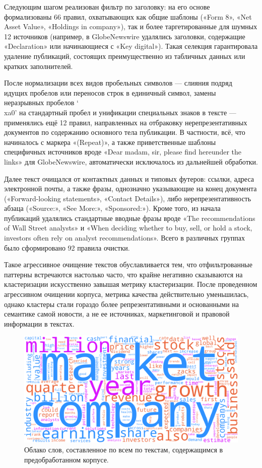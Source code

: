 Следующим шагом реализован фильтр по заголовку: на его основе формализованы 66 правил, охватывающих как общие
шаблоны («Form 8», «Net Asset Value», «Holdings in company»), так и более таргетированные для шумных 12 источников
(например, в GlobeNewswire удалялись заголовки, содержащие «Declaration» или начинающиеся с «Key digital»). Такая
селекция гарантировала удаление публикаций, состоящих преимущественно из табличных данных или кратких заполнителей.

После нормализации всех видов пробельных символов — слияния подряд идущих пробелов или переносов строк в единичный
символ, замены неразрывных пробелов ‘\\xa0’ на стандартный пробел и унификации специальных знаков в тексте ---
применялись ещё 12 правил, направленных на отбраковку нерепрезентативных документов по содержанию основного тела
публикации. В частности, всё, что начиналось с маркера «(Repeat)», а также приветственные шаблоны специфичных
источников вроде «Dear madam, sir, please find hereunder the links» для GlobeNewswire, автоматически исключалось
из дальнейшей обработки.

Далее текст очищался от контактных данных и типовых футеров: ссылки, адреса электронной почты, а также фразы,
однозначно указывающие на конец документа («Forward-looking statements», «Contact Details»), либо нерепрезентативность
абзаца («Source:», «See More:», «Sponsored:»). Кроме того, из начала публикаций удалялись стандартные вводные фразы вроде
«The recommendations of Wall Street analysts» и «When deciding whether to buy, sell, or hold a stock, investors often
rely on analyst recommendations». Всего в различных группах было сформировано 92 правила очистки.

Такое агрессивное очищение текстов обуславливается тем, что отфильтрованные паттерны встречаются настолько часто,
что крайне негативно сказываются на кластеризации искусственно завышая метрику кластеризации. После проведенном
агрессивном очищении корпуса, метрика качества действительно уменьшилась, однако кластеры стали гораздо более
репрезентативными и основанными на семантике самой новости, а не ее источниках, маркетинговой и правовой информации
в текстах.

\begin{figure}[H]
    \centering
    \includegraphics[width=1\linewidth]{img/prep_wordcloud.png}
    \caption{\label{fig:prep_wordcloud} Облако слов, составленное по всем по текстам, содержащимся в предобработанном корпусе.}
\end{figure}


